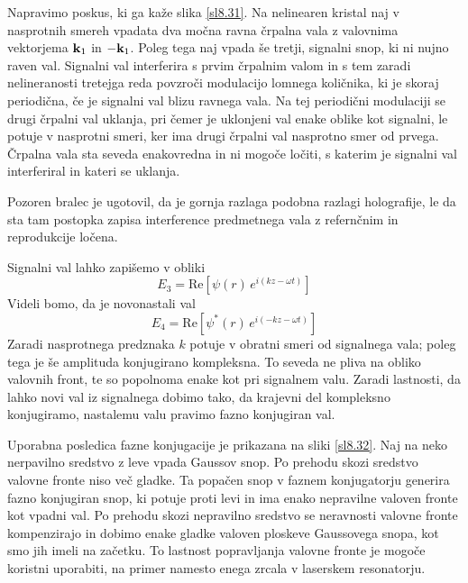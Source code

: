 \documentclass[11pt,fleqn]{book} %
\begin{document}
Napravimo poskus, ki ga kaže slika \ref{sl8.31}. Na nelinearen kristal
naj v nasprotnih smereh vpadata dva močna ravna črpalna vala z valovnima
vektorjema ${\bf k}_{1}$ in $-{\bf k}_{1}$. Poleg tega naj vpada
še tretji, signalni snop, ki ni nujno raven val. Signalni val interferira
s prvim črpalnim valom in s tem zaradi nelineranosti tretejga reda
povzroči modulacijo lomnega količnika, ki je skoraj periodična, če
je signalni val blizu ravnega vala. Na tej periodični modulaciji se
drugi črpalni val uklanja, pri čemer je uklonjeni val enake oblike
kot signalni, le potuje v nasprotni smeri, ker ima drugi črpalni val
nasprotno smer od prvega. Črpalna vala sta seveda enakovredna in ni
mogoče ločiti, s katerim je signalni val interferiral in kateri se
uklanja.

Pozoren bralec je ugotovil, da je gornja razlaga podobna razlagi holografije,
le da sta tam postopka zapisa interference predmetnega vala z refernčnim
in reprodukcije ločena.

Signalni val lahko zapišemo v obliki 
\begin{equation}
E_{3}=\mathrm{Re}\left[\psi\left(r\right)\, e^{i\left(kz-\omega t\right)}\right]\label{8.97}
\end{equation}
 Videli bomo, da je novonastali val 
\begin{equation}
E_{4}=\mathrm{Re}\left[\psi^{*}\left(r\right)\, e^{i\left(-kz-\omega t\right)}\right]\label{8.98}
\end{equation}
 Zaradi nasprotnega predznaka $k$ potuje v obratni smeri od signalnega
vala; poleg tega je še amplituda konjugirano kompleksna. To seveda
ne pliva na obliko valovnih front, te so popolnoma enake kot pri signalnem
valu. Zaradi lastnosti, da lahko novi val iz signalnega dobimo tako,
da krajevni del kompleksno konjugiramo, nastalemu valu pravimo fazno
konjugiran val.

Uporabna posledica fazne konjugacije je prikazana na sliki \ref{sl8.32}.
Naj na neko nerpavilno sredstvo z leve vpada Gaussov snop. Po prehodu
skozi sredstvo valovne fronte niso več gladke. Ta popačen snop v faznem
konjugatorju generira fazno konjugiran snop, ki potuje proti levi
in ima enako nepravilne valoven fronte kot vpadni val. Po prehodu
skozi nepravilno sredstvo se neravnosti valovne fronte kompenzirajo
in dobimo enake gladke valoven ploskeve Gaussovega snopa, kot smo
jih imeli na začetku. To lastnost popravljanja valovne fronte je mogoče
koristni uporabiti, na primer namesto enega zrcala v laserskem resonatorju.
\end{document}
